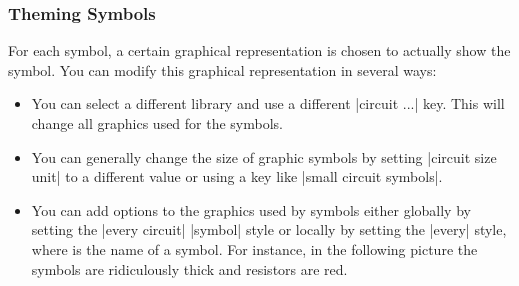 \subsubsection{Theming Symbols}
\label{section-theming-symbols}

For each symbol, a certain graphical representation is chosen to actually show
the symbol. You can modify this graphical representation in several ways:
%
\begin{itemize}
    \item You can select a different library and use a different |circuit ...|
        key. This will change all graphics used for the symbols.
    \item You can generally change the size of graphic symbols by setting
        |circuit size unit| to a different value or using a key like
        |small circuit symbols|.
    \item You can add options to the graphics used by symbols either globally
        by setting the |every circuit| |symbol| style or locally by setting the
        |every|  style, where  is the name of a symbol.
        For instance, in the following picture the symbols are ridiculously
        thick and resistors are red.
\begin{codeexample}[preamble={\usetikzlibrary{circuits.ee.IEC}}]
\begin{tikzpicture}
  [circuit ee IEC,
   every circuit symbol/.style={ultra thick},
   every resistor/.style={red}]


\end{tikzpicture}
\end{codeexample}
\end{itemize}
